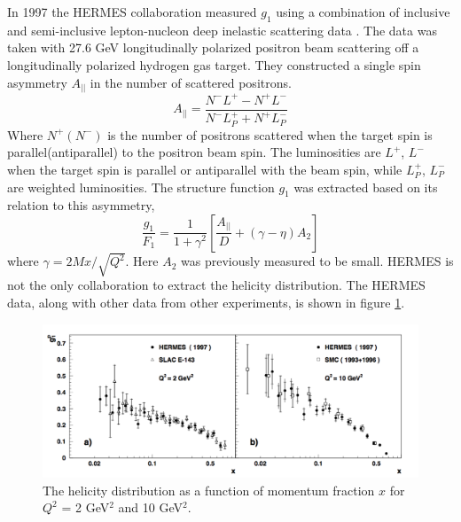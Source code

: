\documentclass[letterpaper, abstract = on,listof=totoc, bibliography=totoc]{scrreprt}
\begin{document}
In 1997 the HERMES collaboration measured $g_1$ using a combination of inclusive and semi-inclusive lepton-nucleon deep inelastic scattering data \cite{hermesHel}. The data was taken with 27.6 GeV longitudinally polarized positron beam scattering off a longitudinally polarized hydrogen gas target. They constructed a single spin asymmetry $A_{||}$ in the number of scattered positrons. 
\begin{equation}
A_{||} = \frac{N^-L^+ - N^+L^-}{N^-L_P^+ + N^+L_P^-} 
\end{equation}
Where $N^+(N^-)$ is the number of positrons scattered when the target spin is parallel(antiparallel) to the positron beam spin. The luminosities are $L^+$, $L^-$ when the target spin is parallel or antiparallel with the beam spin, while $L^+_P$, $L^-_P$ are weighted luminosities. The structure function $g_1$ was extracted based on its relation to this asymmetry,
\begin{equation}
\frac{g_1}{F_1} = \frac{1}{1+\gamma^2}\left[\frac{A_{||}}{D} + (\gamma - \eta)A_2\right]
\end{equation}
where $\gamma = 2Mx/\sqrt{Q^2}$. Here $A_2$ was previously measured to be small\cite{hermesHel}\cite{strucFuncsg1g2}.
HERMES is not the only collaboration to extract the helicity distribution. The HERMES data, along with other data from other experiments, is shown in figure \ref{fig:helicityDist}. 
 \begin{figure}
\begin{center}
\includegraphics[width = 1\textwidth]{helicityDistFromHermes}
\caption[HERMES results for helicity distribution function]{The helicity distribution as a function of momentum fraction $x$ for $Q^2$ = 2 GeV$^2$ and 10 GeV$^2$.}
\label{fig:helicityDist}
\end{center}
\end{figure}
\end{document}
